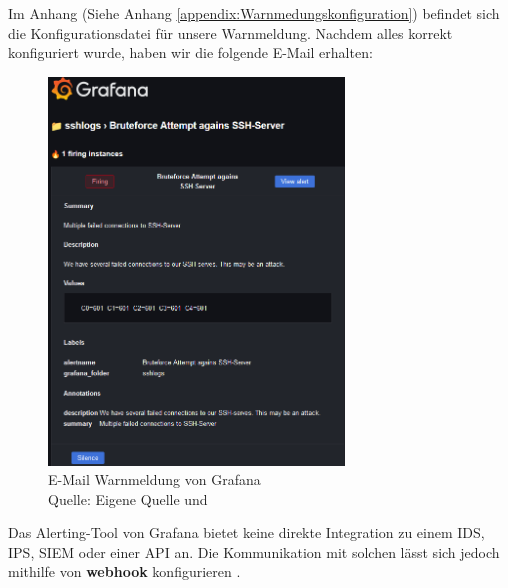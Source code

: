 
Im Anhang (Siehe Anhang \ref{appendix:Warnmedungskonfiguration}) befindet sich die Konfigurationsdatei für unsere Warnmeldung. Nachdem alles korrekt konfiguriert wurde, haben wir die folgende E-Mail erhalten:

\begin{figure}[H]
   \centering
   \includegraphics[width=0.7\textwidth]{assets/GrafanaWarnmeldung.png}
   \caption[E-Mail Warnmeldung von Grafana]
   {E-Mail Warnmeldung von Grafana \\Quelle: Eigene Quelle und \citep{Grafana_alerting}}
   \centering
\end{figure}

Das Alerting-Tool von Grafana bietet keine direkte Integration zu einem \gls{IDS}, \gls{IPS}, \gls{SIEM} oder einer \gls{API} an. Die Kommunikation mit solchen  lässt sich jedoch mithilfe von \textbf{\gls{webhook}} konfigurieren \citep{Grafana_Notifications}.

